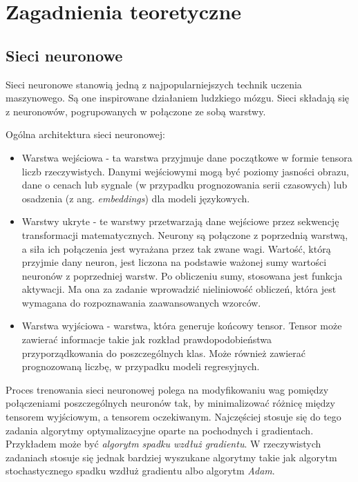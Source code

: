 \chapter{Zagadnienia teoretyczne}


\section{Sieci neuronowe}

Sieci neuronowe stanowią jedną z najpopularniejszych technik uczenia maszynowego.
Są one inspirowane działaniem ludzkiego mózgu.
Sieci składają się z neuronowów, pogrupowanych w połączone ze sobą warstwy.

Ogólna architektura sieci neuronowej:
\begin{itemize}
    \item Warstwa wejściowa - ta warstwa przyjmuje dane początkowe w formie tensora liczb rzeczywistych.
    Danymi wejściowymi mogą być poziomy jasności obrazu, dane o cenach lub sygnale (w przypadku prognozowania serii czasowych) lub osadzenia (z ang. \textit{embeddings}) dla modeli językowych.
    \item Warstwy ukryte - te warstwy przetwarzają dane wejściowe przez sekwencję transformacji matematycznych.
    Neurony są połączone z poprzednią warstwą, a siła ich połączenia jest wyrażana przez tak zwane wagi.
    Wartość, którą przyjmie dany neuron, jest liczona na podstawie ważonej sumy wartości neuronów z poprzedniej warstw.
    Po obliczeniu sumy, stosowana jest funkcja aktywacji.
    Ma ona za zadanie wprowadzić nieliniowość obliczeń, która jest wymagana do rozpoznawania zaawansowanych wzorców.
    \item Warstwa wyjściowa - warstwa, która generuje końcowy tensor.
    Tensor może zawierać informacje takie jak rozkład prawdopodobieństwa przyporządkowania do poszczególnych klas.
    Może również zawierać prognozowaną liczbę, w przypadku modeli regresyjnych.
\end{itemize}

Proces trenowania sieci neuronowej polega na modyfikowaniu wag pomiędzy połączeniami poszczególnych neuronów tak, by minimalizować różnicę między tensorem wyjściowym, a tensorem oczekiwanym.
Najczęściej stosuje się do tego zadania algorytmy optymalizacyjne oparte na pochodnych i gradientach.
Przykładem może być \textit{algorytm spadku wzdłuż gradientu}.
W rzeczywistych zadaniach stosuje się jednak bardziej wyszukane algorytmy takie jak algorytm stochastycznego spadku wzdłuż gradientu albo algorytm \textit{Adam}.

